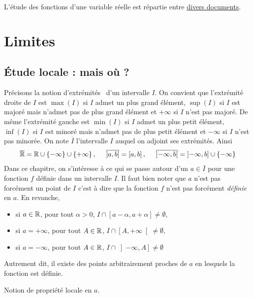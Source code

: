 

L'étude des fonctions d'une variable réelle est répartie entre \href{\baseurl C2063.pdf}{divers documents}.
\section{Limites}
\subsection{\'Etude locale : mais où ?}
Précisons la notion \og d'extrémités\fg~ d'un intervalle $I$. On convient que l'extrémité droite de $I$ est $\max(I)$ si $I$ admet un plus grand élément, $\sup(I)$ si $I$ est majoré mais n'admet pas de plus grand élément et $+\infty$ si $I$ n'est pas majoré. De même l'extrémité gauche est $\min(I)$ si $I$ admet un plus petit élément, $\inf(I)$ si $I$ est minoré mais n'admet pas de plus petit élément et $-\infty$ si $I$ n'est pas minorée. On note $\overline{I}$ l'intervalle $I$ auquel on adjoint ses extrémités. Ainsi
\[
\overline{\mathbb{R}} = \mathbb{R} \cup \left\lbrace  -\infty\right\rbrace \cup \left\lbrace  +\infty\right\rbrace, \hspace{0.5cm}
\overline{\left] a,b\right] } = \left[ a,b \right] , \hspace{0.5cm}
\overline{\left] -\infty ,b\right[} = \left] -\infty,b\right] \cup \left\lbrace  -\infty\right\rbrace
\]
Dans ce chapitre, on s'intéresse à ce qui se passe autour d'un $a \in \overline{I}$ pour une fonction $f$ définie dans un intervalle $I$. Il faut bien noter que $a$ n'est pas forcément un point de $I$ c'est à dire que la fonction $f$ n'est pas forcément \emph{définie} en $a$. En revanche,
\begin{itemize}
 \item si $a\in\mathbb{R}$, pour tout $\alpha > 0$, $I\cap \left[ a-\alpha, a+\alpha \right] \neq \emptyset$,
 \item si $a = +\infty$, pour tout $A\in \mathbb{R}$, $I\cap \left[ A ,+\infty \right[ \neq \emptyset$,
 \item si $a = -\infty$, pour tout $A\in \mathbb{R}$, $I\cap \left] -\infty, A \right] \neq \emptyset$
\end{itemize}
Autrement dit, il existe des points arbitrairement proches de $a$ en lesquels la fonction est définie.

Notion de propriété \og locale en $a$\fg.

